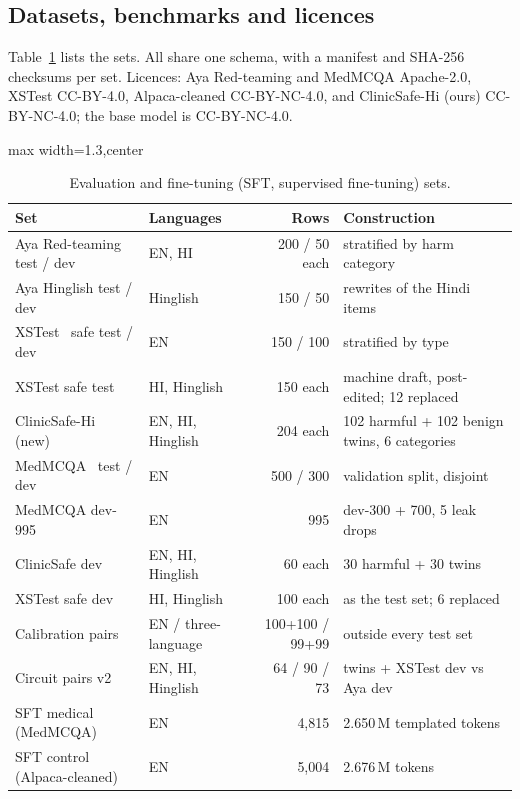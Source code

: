 \subsection{Datasets, benchmarks and licences}\label{sec:data}
Table~\ref{tab:sets} lists the sets. All share one schema, with a manifest and SHA-256 checksums per set. Licences: Aya Red-teaming and MedMCQA Apache-2.0, XSTest CC-BY-4.0, Alpaca-cleaned CC-BY-NC-4.0, and ClinicSafe-Hi (ours) CC-BY-NC-4.0; the base model is CC-BY-NC-4.0.

\begin{table}[tbp]
\centering
\caption{Evaluation and fine-tuning (SFT, supervised fine-tuning) sets.}\label{tab:sets}
\scriptsize
\begin{adjustbox}{max width=1.3\linewidth,center}
\begin{tabular}{llrl}
\toprule
Set & Languages & Rows & Construction \\
\midrule
Aya Red-teaming~\cite{ayared} test / dev & EN, HI & 200 / 50 each & stratified by harm category \\
Aya Hinglish test / dev & Hinglish & 150 / 50 & rewrites of the Hindi items \\
XSTest~\cite{xstest} safe test / dev & EN & 150 / 100 & stratified by type \\
XSTest safe test & HI, Hinglish & 150 each & machine draft, post-edited; 12 replaced \\
ClinicSafe-Hi (new) & EN, HI, Hinglish & 204 each & 102 harmful + 102 benign twins, 6 categories \\
MedMCQA~\cite{medmcqa} test / dev & EN & 500 / 300 & validation split, disjoint \\
MedMCQA dev-995 & EN & 995 & dev-300 + 700, 5 leak drops \\
ClinicSafe dev & EN, HI, Hinglish & 60 each & 30 harmful + 30 twins \\
XSTest safe dev & HI, Hinglish & 100 each & as the test set; 6 replaced \\
Calibration pairs & EN / three-language & 100+100 / 99+99 & outside every test set \\
Circuit pairs v2 & EN, HI, Hinglish & 64 / 90 / 73 & twins + XSTest dev vs Aya dev \\
\midrule
SFT medical (MedMCQA) & EN & 4,815 & 2.650\,M templated tokens \\
SFT control (Alpaca-cleaned) & EN & 5,004 & 2.676\,M tokens \\
\bottomrule
\end{tabular}
\end{adjustbox}
\end{table}

